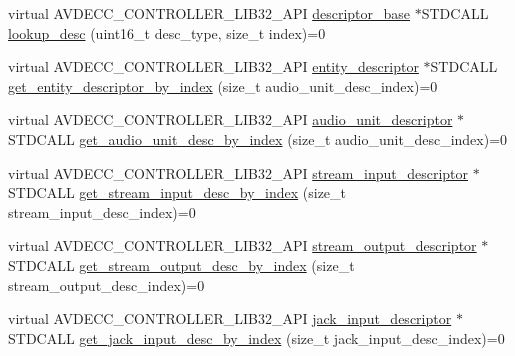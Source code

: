 \begin{DoxyCompactItemize}
\item 
virtual A\+V\+D\+E\+C\+C\+\_\+\+C\+O\+N\+T\+R\+O\+L\+L\+E\+R\+\_\+\+L\+I\+B32\+\_\+\+A\+PI \hyperlink{classavdecc__lib_1_1descriptor__base}{descriptor\+\_\+base} $\ast$S\+T\+D\+C\+A\+LL \hyperlink{classavdecc__lib_1_1configuration__descriptor_a21110c55f9064bbae432ae984106bb26}{lookup\+\_\+desc} (uint16\+\_\+t desc\+\_\+type, size\+\_\+t index)=0
\item 
virtual A\+V\+D\+E\+C\+C\+\_\+\+C\+O\+N\+T\+R\+O\+L\+L\+E\+R\+\_\+\+L\+I\+B32\+\_\+\+A\+PI \hyperlink{classavdecc__lib_1_1entity__descriptor}{entity\+\_\+descriptor} $\ast$S\+T\+D\+C\+A\+LL \hyperlink{classavdecc__lib_1_1configuration__descriptor_aa50eb13c725d2b10676ff71d99e19fe7}{get\+\_\+entity\+\_\+descriptor\+\_\+by\+\_\+index} (size\+\_\+t audio\+\_\+unit\+\_\+desc\+\_\+index)=0
\item 
virtual A\+V\+D\+E\+C\+C\+\_\+\+C\+O\+N\+T\+R\+O\+L\+L\+E\+R\+\_\+\+L\+I\+B32\+\_\+\+A\+PI \hyperlink{classavdecc__lib_1_1audio__unit__descriptor}{audio\+\_\+unit\+\_\+descriptor} $\ast$S\+T\+D\+C\+A\+LL \hyperlink{classavdecc__lib_1_1configuration__descriptor_aa723a66eba00ad8c8f5361951f5af6e7}{get\+\_\+audio\+\_\+unit\+\_\+desc\+\_\+by\+\_\+index} (size\+\_\+t audio\+\_\+unit\+\_\+desc\+\_\+index)=0
\item 
virtual A\+V\+D\+E\+C\+C\+\_\+\+C\+O\+N\+T\+R\+O\+L\+L\+E\+R\+\_\+\+L\+I\+B32\+\_\+\+A\+PI \hyperlink{classavdecc__lib_1_1stream__input__descriptor}{stream\+\_\+input\+\_\+descriptor} $\ast$S\+T\+D\+C\+A\+LL \hyperlink{classavdecc__lib_1_1configuration__descriptor_a69cfe9032cea21937b4153878f8a925c}{get\+\_\+stream\+\_\+input\+\_\+desc\+\_\+by\+\_\+index} (size\+\_\+t stream\+\_\+input\+\_\+desc\+\_\+index)=0
\item 
virtual A\+V\+D\+E\+C\+C\+\_\+\+C\+O\+N\+T\+R\+O\+L\+L\+E\+R\+\_\+\+L\+I\+B32\+\_\+\+A\+PI \hyperlink{classavdecc__lib_1_1stream__output__descriptor}{stream\+\_\+output\+\_\+descriptor} $\ast$S\+T\+D\+C\+A\+LL \hyperlink{classavdecc__lib_1_1configuration__descriptor_a300ea5957342e2e9579318135da02856}{get\+\_\+stream\+\_\+output\+\_\+desc\+\_\+by\+\_\+index} (size\+\_\+t stream\+\_\+output\+\_\+desc\+\_\+index)=0
\item 
virtual A\+V\+D\+E\+C\+C\+\_\+\+C\+O\+N\+T\+R\+O\+L\+L\+E\+R\+\_\+\+L\+I\+B32\+\_\+\+A\+PI \hyperlink{classavdecc__lib_1_1jack__input__descriptor}{jack\+\_\+input\+\_\+descriptor} $\ast$S\+T\+D\+C\+A\+LL \hyperlink{classavdecc__lib_1_1configuration__descriptor_a15cc383da412f84492d0d61cb581a8e1}{get\+\_\+jack\+\_\+input\+\_\+desc\+\_\+by\+\_\+index} (size\+\_\+t jack\+\_\+input\+\_\+desc\+\_\+index)=0

\end{DoxyCompactItemize}
